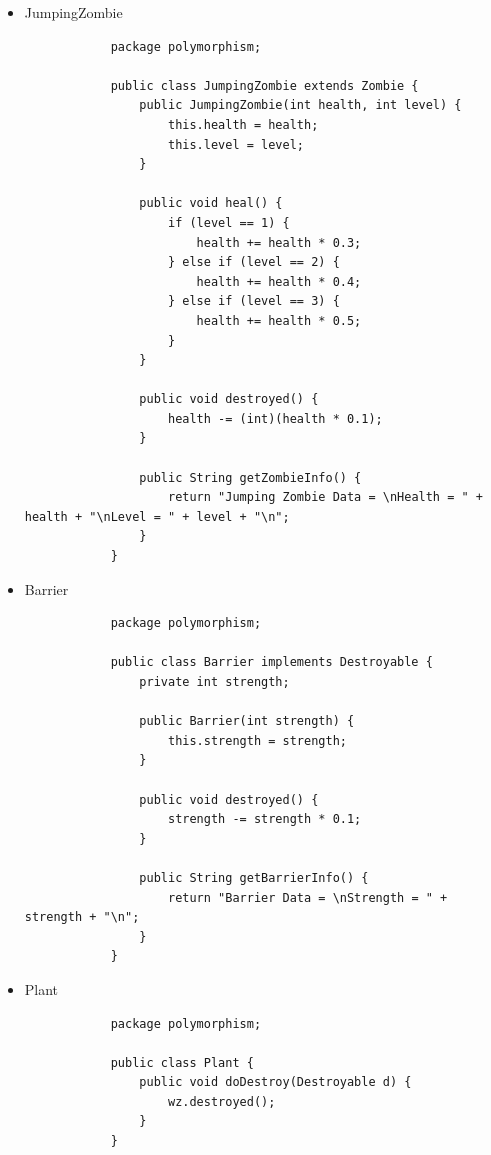 \documentclass[12pt,titlepage]{article}
\begin{document}
\begin{itemize}
{\begin{verbatim}
                public void destroyed() {
                    health -= (int)(health * 0.2);
                }

                public String getZombieInfo() {
                    return "Walking Zombie Data = \nHealth = " + health + "\nLevel = " + level + "\n";
                }
            }
        \end{verbatim}
    }
    \item {
        JumpingZombie
        \begin{verbatim}
            package polymorphism;

            public class JumpingZombie extends Zombie {
                public JumpingZombie(int health, int level) {
                    this.health = health;
                    this.level = level;
                }

                public void heal() {
                    if (level == 1) {
                        health += health * 0.3;
                    } else if (level == 2) {
                        health += health * 0.4;
                    } else if (level == 3) {
                        health += health * 0.5;
                    }
                }

                public void destroyed() {
                    health -= (int)(health * 0.1);
                }

                public String getZombieInfo() {
                    return "Jumping Zombie Data = \nHealth = " + health + "\nLevel = " + level + "\n";
                }
            }
        \end{verbatim}
    }
    \item {
        Barrier
        \begin{verbatim}
            package polymorphism;

            public class Barrier implements Destroyable {
                private int strength;

                public Barrier(int strength) {
                    this.strength = strength;
                }

                public void destroyed() {
                    strength -= strength * 0.1;
                }

                public String getBarrierInfo() {
                    return "Barrier Data = \nStrength = " + strength + "\n";
                }
            }
        \end{verbatim}
    }
    \item {
        Plant
        \begin{verbatim}
            package polymorphism;

            public class Plant {
                public void doDestroy(Destroyable d) {
                    wz.destroyed();
                }
            }
        \end{verbatim}
    }
\end{itemize}
\end{document}
